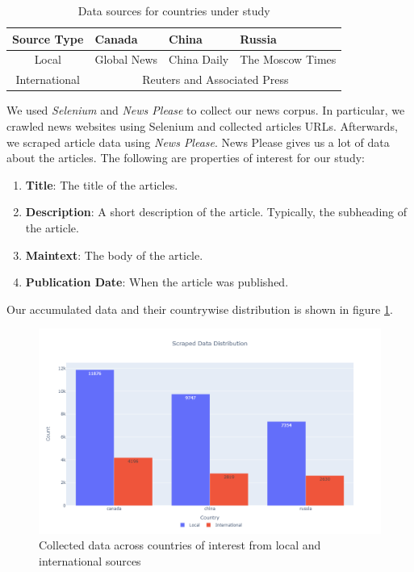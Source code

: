 \documentclass{article}
\theoremstyle{mytheoremstyle}
\theoremstyle{mytheoremstyle}
\theoremstyle{myproblemstyle}
\begin{document}
    \begin{table}[ph]
        \centering
        \begin{tabular}{|c|l|l|l|}
            \hline
            Source Type & Canada & China & Russia \\
            \hline
            Local & Global News & China Daily & The Moscow Times \\
            \hline
            International & \multicolumn{3}{c|}{Reuters and Associated Press} \\
            \hline
        \end{tabular}
        \caption{Data sources for countries under study}
        \label{table:data_sources}
    \end{table}

    We used \emph{Selenium} and \emph{News Please} to collect our news corpus. In particular, we crawled news websites using Selenium and collected articles URLs. Afterwards, we scraped article data using \emph{News Please}. News Please gives us a lot of data about the articles. \cite{Hamborg2017} The following are properties of interest for our study:

    \begin{enumerate}
        \item \textbf{Title}: The title of the articles.
        \item \textbf{Description}: A short description of the article. Typically, the subheading of the article.
        \item \textbf{Maintext}: The body of the article.
        \item \textbf{Publication Date}: When the article was published.
    \end{enumerate}

    Our accumulated data and their countrywise distribution is shown in figure \ref{fig:raw_data}.
    
    \begin{figure}[ht]
        \centering
        \includegraphics[width=0.75\linewidth]{../images/plots/barchart_scraped_data.png}
        \caption{Collected data across countries of interest from local and international sources}
        \label{fig:raw_data}
    \end{figure}
\end{document}
